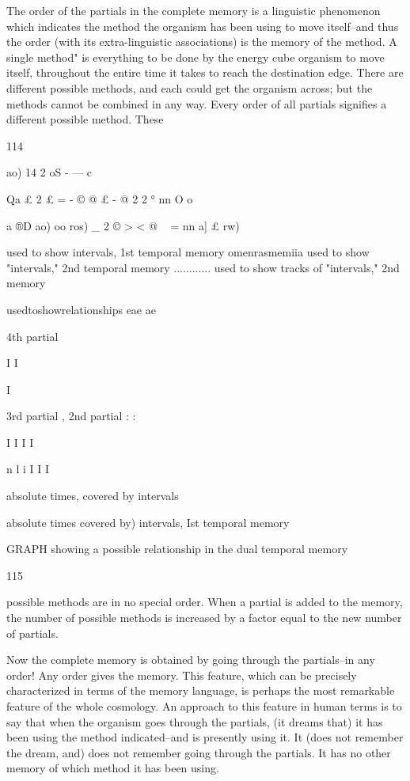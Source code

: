 \documentclass[10pt,twoside]{memoir}
\begin{document}
\begin{enumerate}
{{{{{{{{{{{{{{{The order of the partials in the complete memory is a linguistic 
phenomenon which indicates the method the organism has been using to 
move itself--and thus the order (with its extra-linguistic associations) is the 
memory of the method. A single method" is everything to be done by the 
energy cube organism to move itself, throughout the entire time it takes to 
reach the destination edge. There are different possible methods, and each 
could get the organism across; but the methods cannot be combined in any 
way. Every order of all partials signifies a different possible method. These 


114 


ao) 
14 
2 
oS 
- 
— 
c 

Qa 
£ 
2 
£ 
= 
- 
© 
@ 
£ 
- 
@ 
2 
2 
° 
nn 
O 
o 


a 
®D 
ao) 
oo 
ros) 
_ 
2 
© 
> 
< 
@ 
~ 
= 
nn 
a] 
£ 
rw) 


used to show intervals, 1st temporal memory omenrasmemiia 
used to show "intervals," 2nd temporal memory ............ 
used to show tracks of "intervals," 2nd memory 

usedtoshowrelationships eae ae 


4th partial 


I 
I 


I 

3rd partial 
, 2nd partial 
: : 

I I 
I I 


n 
l i 
I 
I I 


absolute times, covered by intervals 
{absolute times covered by) intervals, 
Ist temporal memory 


GRAPH showing a possible relationship 
in the dual temporal memory 


115 


possible methods are in no special order. When a partial is added to the 
memory, the number of possible methods is increased by a factor equal to 
the new number of partials. 


Now the complete memory is obtained by going through the partials--in 
any order! Any order gives the memory. This feature, which can be 
precisely characterized in terms of the memory language, is perhaps the most 
remarkable feature of the whole cosmology. An approach to this feature in 
human terms is to say that when the organism goes through the partials, (it 
dreams that) it has been using the method indicated--and is presently using 
it. It (does not remember the dream, and) does not remember going through 
the partials. It has no other memory of which method it has been using. 

}}}}}}}}}}}}}}}}
\end{enumerate}
\end{document}
